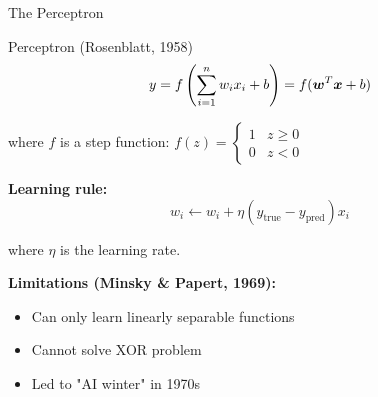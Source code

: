 \documentclass[aspectratio=169]{beamer}
\begin{document}
\begin{frame}{The Perceptron}
  \begin{definitionbox}{Perceptron (Rosenblatt, 1958)}
    \begin{equation}
      y = f\left(\sum_{i=1}^n w_i x_i + b\right) = f(\boldsymbol{w}^T \boldsymbol{x} + b)
    \end{equation}

    where $f$ is a step function: $f(z) = \begin{cases} 1 & z \geq 0 \\ 0 & z < 0 \end{cases}$
  \end{definitionbox}

  \vspace{0.5em}

  \textbf{Learning rule:}
  \begin{equation}
    w_i \leftarrow w_i + \eta (y_{\text{true}} - y_{\text{pred}}) x_i
  \end{equation}

  where $\eta$ is the learning rate.

  \vspace{0.5em}

  \textbf{Limitations (Minsky \& Papert, 1969):}
  \begin{itemize}
    \item Can only learn linearly separable functions
    \item Cannot solve XOR problem
    \item Led to "AI winter" in 1970s
  \end{itemize}
\end{frame}
\end{document}
